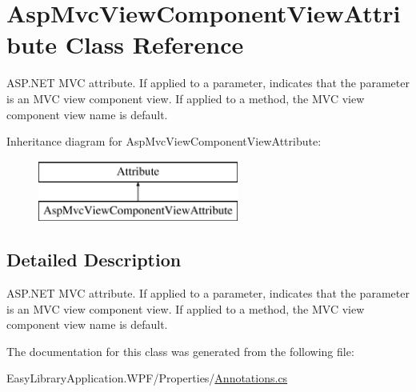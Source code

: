 \hypertarget{class_asp_mvc_view_component_view_attribute}{}\section{Asp\+Mvc\+View\+Component\+View\+Attribute Class Reference}
\label{class_asp_mvc_view_component_view_attribute}


A\+S\+P.\+N\+ET M\+VC attribute. If applied to a parameter, indicates that the parameter is an M\+VC view component view. If applied to a method, the M\+VC view component view name is default.  


Inheritance diagram for Asp\+Mvc\+View\+Component\+View\+Attribute\+:\begin{figure}[H]
\begin{center}
\leavevmode
\includegraphics[height=2.000000cm]{class_asp_mvc_view_component_view_attribute}
\end{center}
\end{figure}


\subsection{Detailed Description}
A\+S\+P.\+N\+ET M\+VC attribute. If applied to a parameter, indicates that the parameter is an M\+VC view component view. If applied to a method, the M\+VC view component view name is default. 



The documentation for this class was generated from the following file\+:\begin{DoxyCompactItemize}
\item 
Easy\+Library\+Application.\+W\+P\+F/\+Properties/\mbox{\hyperlink{_annotations_8cs}{Annotations.\+cs}}\end{DoxyCompactItemize}
